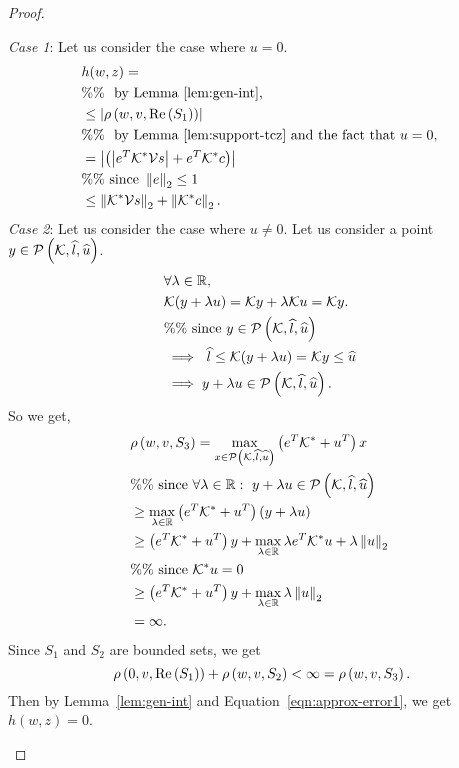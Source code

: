 \begin{proof}
\begin{enumerate}
  {\it Case 1}:  Let us consider the case where $u=0$.
  \begin{align*}
& h(w,z) = \\
    & \%\%~~\text{by Lemma~\ref{lem:gen-int}},\\
    &\leq \left|\rho\left(w,v,\operatorname{Re}\left(S_1\right)\right)\right|\\
    & \%\%~~\text{by Lemma~\ref{lem:support-tcz} and the fact that}~u=0,\\
    & = \left|\left(\left|e^T\mathcal{K}^*\mathcal{V}s\right|+e^T\mathcal{K}^*c\right)\right|\\
    & \%\%~\text{since}~\left\|e\right\|_{2}\leq 1\\
    & \leq \left\|\mathcal{K}^*\mathcal{V}s\right\|_{2}+\left\|\mathcal{K}^*c\right\|_{2}.
  \end{align*}
      {\it Case 2}: Let us consider the case where $u\neq 0$.  Let us
  consider a point $y\in\mathcal{P}\left(\mathcal{K},\widehat{l},\widehat{u}\right)$.
  \begin{align*}
    & \forall\lambda\in\mathbb{R},\nonumber\\
    & \mathcal{K}(y+\lambda u)=\mathcal{K} y +\lambda\mathcal{K} u=\mathcal{K} y.\nonumber\\
    & \%\%~\text{since}~y\in\mathcal{P}\left(\mathcal{K},\widehat{l},\widehat{u}\right)\nonumber\\
    & \implies~\widehat{l}\leq\mathcal{K}(y+\lambda u)=\mathcal{K} y\leq \widehat{u}\nonumber\\
    & \implies y+\lambda u\in\mathcal{P}\left(\mathcal{K},\widehat{l},\widehat{u}\right).\\
  \end{align*}
  So we get,
  \begin{align*}
    & \rho\left(w,v,S_3\right)=\max_{x\in\mathcal{P}\left(\mathcal{K},\widehat{l},\widehat{u}\right)}\left(e^T\mathcal{K}^*+u^T\right)x\\
    & \%\%~\text{since}~\forall\lambda\in\mathbb{R}:~y+\lambda u\in\mathcal{P}\left(\mathcal{K},\widehat{l},\widehat{u}\right)\\
    & \geq \max_{\lambda\in\mathbb{R}}\left(e^T\mathcal{K}^*+u^T\right)\left(y+\lambda u\right)\\
    & \geq \left(e^T\mathcal{K}^*+u^T\right)y+\max_{\lambda\in\mathbb{R}}\lambda e^T\mathcal{K}^*u+\lambda\left\|u\right\|_{2}\\
    & \%\%~\text{since}~\mathcal{K}^* u=0\\
    & \geq \left(e^T\mathcal{K}^*+u^T\right)y+\max_{\lambda\in\mathbb{R}}\lambda\left\|u\right\|_{2}\\
    & = \infty.
  \end{align*}
  Since $S_1$ and $S_2$ are bounded sets, we get
  \begin{equation}~\label{eqn:approx-error1}
    \rho\left(0,v,\operatorname{Re}\left(S_1\right)\right)+\rho\left(w,v,S_2\right)<\infty=\rho\left(w,v,S_3\right).
  \end{equation}
  Then by Lemma~\ref{lem:gen-int} and
  Equation~\ref{eqn:approx-error1}, we get $h(w,z)=0$.


\end{enumerate}
\end{proof}

